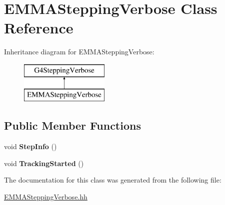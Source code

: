 \hypertarget{classEMMASteppingVerbose}{\section{E\-M\-M\-A\-Stepping\-Verbose Class Reference}
\label{classEMMASteppingVerbose}
}
Inheritance diagram for E\-M\-M\-A\-Stepping\-Verbose\-:\begin{figure}[H]
\begin{center}
\leavevmode
\includegraphics[height=2.000000cm]{classEMMASteppingVerbose}
\end{center}
\end{figure}
\subsection*{Public Member Functions}
\begin{DoxyCompactItemize}
\item 
\hypertarget{classEMMASteppingVerbose_aab0b7f8fa449f26342e68b2d2adbec84}{void {\bfseries Step\-Info} ()}\label{classEMMASteppingVerbose_aab0b7f8fa449f26342e68b2d2adbec84}

\item 
\hypertarget{classEMMASteppingVerbose_a55f521f1fc939b41027b250733d1dd58}{void {\bfseries Tracking\-Started} ()}\label{classEMMASteppingVerbose_a55f521f1fc939b41027b250733d1dd58}

\end{DoxyCompactItemize}


The documentation for this class was generated from the following file\-:\begin{DoxyCompactItemize}
\item 
\hyperlink{EMMASteppingVerbose_8hh}{E\-M\-M\-A\-Stepping\-Verbose.\-hh}\end{DoxyCompactItemize}
